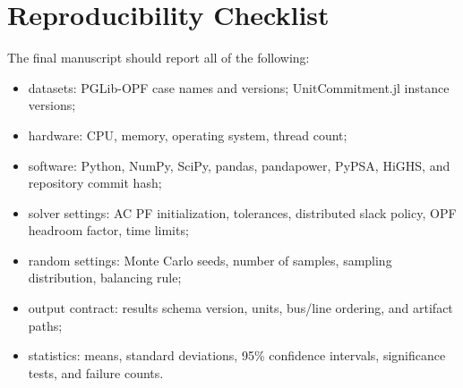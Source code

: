 \documentclass[11pt]{article}
\begin{document}
\section*{Reproducibility Checklist}

The final manuscript should report all of the following:
\begin{itemize}[leftmargin=*]
  \item datasets: PGLib-OPF case names and versions; UnitCommitment.jl instance versions;
  \item hardware: CPU, memory, operating system, thread count;
  \item software: Python, NumPy, SciPy, pandas, pandapower, PyPSA, HiGHS, and repository commit hash;
  \item solver settings: AC PF initialization, tolerances, distributed slack policy, OPF headroom factor, time limits;
  \item random settings: Monte Carlo seeds, number of samples, sampling distribution, balancing rule;
  \item output contract: results schema version, units, bus/line ordering, and artifact paths;
  \item statistics: means, standard deviations, 95\% confidence intervals, significance tests, and failure counts.
\end{itemize}



\end{document}
